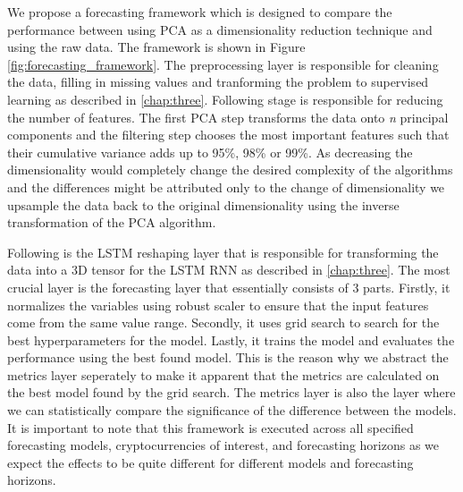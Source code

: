 We propose a forecasting framework which is designed to compare the performance between using \ac{PCA} as a 
dimensionality reduction technique and using the raw data. 
The framework is shown in Figure \ref{fig:forecasting_framework}.
The preprocessing layer is responsible for cleaning the data, filling in missing values and tranforming 
the problem to supervised learning as described 
in \ref{chap:three}. Following stage is responsible for reducing the number of features. 
The first \ac{PCA} step transforms the data onto \textit{n} principal components and the filtering step
chooses the most important features such that their cumulative variance adds up to 95\%, 98\% or 99\%.
As decreasing the dimensionality would completely change the desired
complexity of the algorithms and the differences might be attributed only to the change 
of dimensionality we upsample the data back to the original dimensionality using 
the inverse transformation of the \ac{PCA} algorithm.

Following is the \ac{LSTM} reshaping layer that is responsible for transforming the data into a 3D tensor for 
the \ac{LSTM} \ac{RNN} as described 
in \ref{chap:three}. The most crucial layer is the forecasting layer that essentially consists of 3 parts.
Firstly, it normalizes the variables using robust scaler to ensure that the input features come from 
the same value range. Secondly, it uses grid search to search for the best
hyperparameters for the model. 
Lastly, it trains the model and evaluates the performance using the best found model. This is the reason
why we abstract the metrics layer seperately to make it apparent that the metrics are calculated
on the best model found by the grid search. The metrics layer is also the layer where
we can statistically compare the significance of the difference between the models.
It is important to note that this framework is executed across all specified forecasting models, 
cryptocurrencies of interest, and forecasting horizons as we expect the effects
to be quite different for different models and forecasting horizons. 


